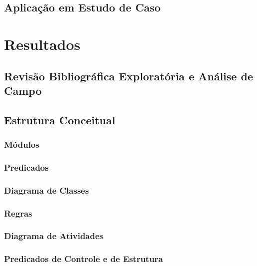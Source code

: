 \documentclass[openright]{normas-utf-tex} %
\begin{document}
    \section{Aplicação em Estudo de Caso}    
        \label{inferencias}

\chapter{Resultados}
\label{chap:resul}
	
	\section{Revisão Bibliográfica Exploratória e Análise de Campo} \label{resrevisaoexploratoria}
		
	\section{Estrutura Conceitual} \label{estconceitual}
		
		\subsection{Módulos} \label{mods}			
			
		\subsection{Predicados}\label{predic}
			
		\subsection{Diagrama de Classes}
			
		\subsection{Regras} \label{regras}
			
		\subsection{Diagrama de Atividades} \label{umldiagram}
			
		\subsection{Predicados de Controle e de Estrutura} \label{cenarios}
			
\end{document}

